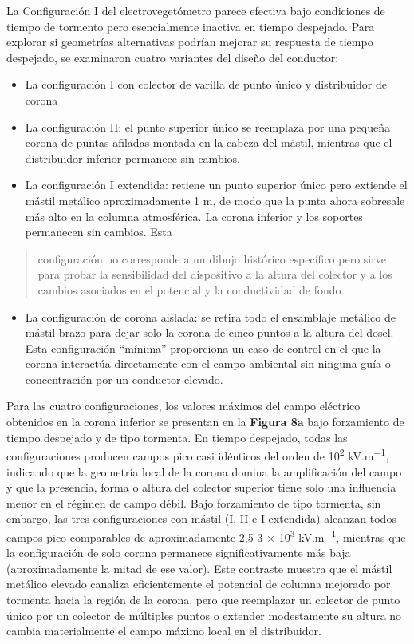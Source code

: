 \documentclass[
]{article}
\providecommand{\tightlist}{%
  \setlength{\itemsep}{0pt}\setlength{\parskip}{0pt}}
\begin{document}
La Configuración I del electrovegetómetro parece efectiva bajo
condiciones de tiempo de tormento pero esencialmente inactiva en tiempo
despejado. Para explorar si geometrías alternativas podrían mejorar su
respuesta de tiempo despejado, se examinaron cuatro variantes del diseño
del conductor:

\begin{itemize}
\item
  La configuración I con colector de varilla de punto único y
  distribuidor de corona
\item
  La configuración II: el punto superior único se reemplaza por una
  pequeña corona de puntas afiladas montada en la cabeza del mástil,
  mientras que el distribuidor inferior permanece sin cambios.
\item
  La configuración I extendida: retiene un punto superior único pero
  extiende el mástil metálico aproximadamente 1 m, de modo que la punta
  ahora sobresale más alto en la columna atmosférica. La corona inferior
  y los soportes permanecen sin cambios. Esta
\end{itemize}

\begin{quote}
configuración no corresponde a un dibujo histórico específico pero sirve
para probar la sensibilidad del dispositivo a la altura del colector y a
los cambios asociados en el potencial y la conductividad de fondo.
\end{quote}

\begin{itemize}
\tightlist
\item
  La configuración de corona aislada: se retira todo el ensamblaje
  metálico de mástil-brazo para dejar solo la corona de cinco puntos a
  la altura del dosel. Esta configuración ``mínima'' proporciona un caso
  de control en el que la corona interactúa directamente con el campo
  ambiental sin ninguna guía o concentración por un conductor elevado.
\end{itemize}

Para las cuatro configuraciones, los valores máximos del campo eléctrico
obtenidos en la corona inferior se presentan en la \textbf{Figura 8a}
bajo forzamiento de tiempo despejado y de tipo tormenta. En tiempo
despejado, todas las configuraciones producen campos pico casi idénticos
del orden de 10\textsuperscript{2} kV.m\textsuperscript{−1}, indicando
que la geometría local de la corona domina la amplificación del campo y
que la presencia, forma o altura del colector superior tiene solo una
influencia menor en el régimen de campo débil. Bajo forzamiento de tipo
tormenta, sin embargo, las tres configuraciones con mástil (I, II e I
extendida) alcanzan todos campos pico comparables de aproximadamente
2,5-3 × 10\textsuperscript{3} kV.m\textsuperscript{−1}, mientras que la
configuración de solo corona permanece significativamente más baja
(aproximadamente la mitad de ese valor). Este contraste muestra que el
mástil metálico elevado canaliza eficientemente el potencial de columna
mejorado por tormenta hacia la región de la corona, pero que reemplazar
un colector de punto único por un colector de múltiples puntos o
extender modestamente su altura no cambia materialmente el campo máximo
local en el distribuidor.
\end{document}
